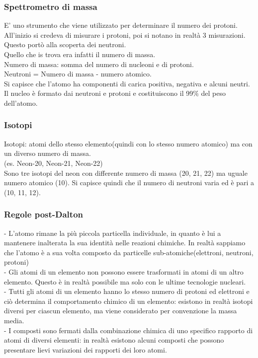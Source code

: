 \subsubsection{Spettrometro di massa}
E' uno strumento che viene utilizzato per determinare il numero dei protoni.\\
All'inizio si credeva di misurare i protoni, poi si notano in realtà 3 misurazioni. Questo portò alla scoperta dei neutroni.\\
Quello che is trova era infatti il numero di massa.\\
Numero di massa: somma del numero di nucleoni e di protoni.\\
Neutroni = Numero di massa - numero atomico.\\
Si capisce che l'atomo ha componenti di carica positiva, negativa e alcuni neutri. Il nucleo è formato dai neutroni e protoni e costituiscono il 99\% del peso dell'atomo.
\subsubsection{Isotopi}
Isotopi: atomi dello stesso elemento(quindi con lo stesso numero atomico) ma con un diverso numero di massa.\\
(es. Neon-20, Neon-21, Neon-22)\\
Sono tre isotopi del neon con differente numero di massa (20, 21, 22) ma uguale numero atomico (10). Si capisce quindi che il numero di neutroni varia ed è pari a (10, 11, 12).
\subsubsection{Regole post-Dalton}
- L'atomo rimane la più piccola particella individuale, in quanto è lui a mantenere inalterata la sua identità nelle reazioni chimiche. In realtà sappiamo che l'atomo è a sua volta composto da particelle sub-atomiche(elettroni, neutroni, protoni)\\
- Gli atomi di un elemento non possono essere trasformati in atomi di un altro elemento. Questo è in realtà possibile ma solo con  le ultime tecnologie nucleari.\\
- Tutti gli atomi di un elemento hanno lo stesso numero di protoni ed elettroni e ciò determina il comportamento chimico di un elemento: esistono in realtà isotopi diversi per ciascun elemento, ma viene considerato per convenzione la massa media.\\
- I composti sono fermati dalla combinazione chimica di uno specifico rapporto di atomi di diversi elementi: in realtà esistono alcuni composti che possono presentare lievi variazioni dei rapporti dei loro atomi.
